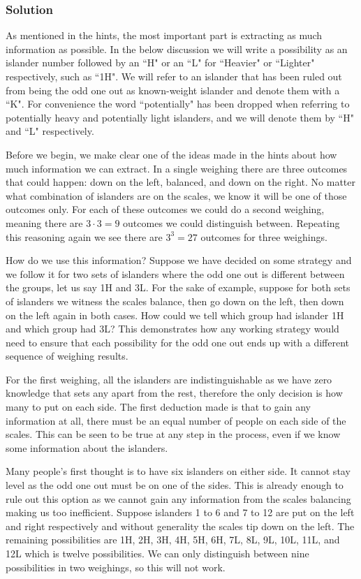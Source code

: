 \subsubsection{Solution}

As mentioned in the hints, the most important part is extracting as much information as possible. In the below discussion we will write a possibility as an islander number followed by an ``H" or an ``L" for ``Heavier" or ``Lighter" respectively, such as ``1H". We will refer to an islander that has been ruled out from being the odd one out as known-weight islander and denote them with a ``K". For convenience the word ``potentially" has been dropped when referring to potentially heavy and potentially light islanders, and we will denote them by ``H" and ``L" respectively.

Before we begin, we make clear one of the ideas made in the hints about how much information we can extract. In a single weighing there are three outcomes that could happen: down on the left, balanced, and down on the right. No matter what combination of islanders are on the scales, we know it will be one of those outcomes only. For each of these outcomes we could do a second weighing, meaning there are $3 \cdot 3 = 9$ outcomes we could distinguish between. Repeating this reasoning again we see there are $3^3 = 27$ outcomes for three weighings.

How do we use this information? Suppose we have decided on some strategy and we follow it for two sets of islanders where the odd one out is different between the groups, let us say 1H and 3L. For the sake of example, suppose for both sets of islanders we witness the scales balance, then go down on the left, then down on the left again in both cases. How could we tell which group had islander 1H and which group had 3L? This demonstrates how any working strategy would need to ensure that each possibility for the odd one out ends up with a different sequence of weighing results.

For the first weighing, all the islanders are indistinguishable as we have zero knowledge that sets any apart from the rest, therefore the only decision is how many to put on each side. The first deduction made is that to gain any information at all, there must be an equal number of people on each side of the scales. This can be seen to be true at any step in the process, even if we know some information about the islanders.

Many people's first thought is to have six islanders on either side. It cannot stay level as the odd one out must be on one of the sides. This is already enough to rule out this option as we cannot gain any information from the scales balancing making us too inefficient. Suppose islanders 1 to 6 and 7 to 12 are put on the left and right respectively and without generality the scales tip down on the left. The remaining possibilities are 1H, 2H, 3H, 4H, 5H, 6H, 7L, 8L, 9L, 10L, 11L, and 12L which is twelve possibilities. We can only distinguish between nine possibilities in two weighings, so this will not work.

